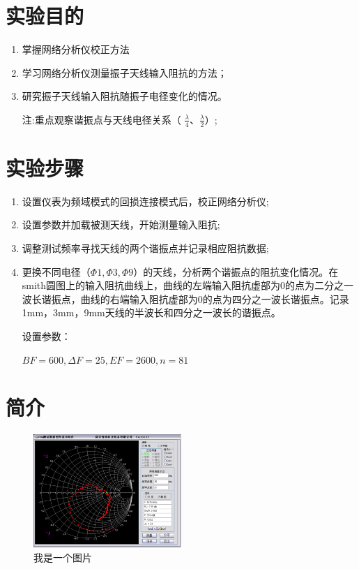 \section{实验目的}

\begin{enumerate}
    \item 掌握网络分析仪校正方法
    \item 学习网络分析仪测量振子天线输入阻抗的方法；
    \item 研究振子天线输入阻抗随振子电径变化的情况。

        注:重点观察谐振点与天线电径关系（ $\frac{\lambda}{4}$、$\frac{\lambda}{2}$）;

\end{enumerate}

\section{实验步骤} %
\label{sec:实验步骤}
\begin{enumerate}[(1)~]
    \item 设置仪表为频域模式的回损连接模式后，校正网络分析仪;
    \item 设置参数并加载被测天线，开始测量输入阻抗;
    \item 调整测试频率寻找天线的两个谐振点并记录相应阻抗数据;
    \item 更换不同电径（$\Phi1, \Phi3, \Phi9$）的天线，分析两个谐振点的阻抗变化情况。在smith圆图上的输入阻抗曲线上，曲线的左端输入阻抗虚部为0的点为二分之一波长谐振点，曲线的右端输入阻抗虚部为0的点为四分之一波长谐振点。记录1mm，3mm，9mm天线的半波长和四分之一波长的谐振点。

        设置参数：

        $BF=600, \Delta F=25, EF=2600, n=81$
\end{enumerate}

\section{简介}

\begin{figure}[H]
\centering
\includegraphics[width=0.5\textwidth]{images/pic1.png}
\caption{我是一个图片}
\end{figure}


